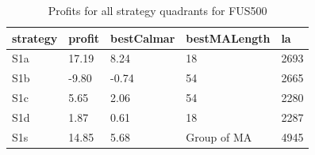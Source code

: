 \documentclass{tewiart}
\begin{document}
\newpage
\begin{table}[!t]
\caption{Profits for all strategy quadrants for FUS500}
 \begin{center}
 \begin{tabular}{|l|l|l|l|l|}
 \hline \textbf{strategy} & \textbf{profit} & \textbf{bestCalmar} & \textbf{bestMALength} & \textbf{la} \\ \hline
S1a & 17.19 & 8.24 & 18 & 2693\\ \hline
S1b & -9.80 & -0.74 & 54 & 2665\\ \hline
S1c & 5.65 & 2.06 & 54 & 2280\\ \hline
S1d & 1.87 & 0.61 & 18 & 2287\\ \hline
S1s & 14.85 & 5.68 & Group of MA & 4945\\
\hline \end{tabular}
 \end{center}
 \end{table}
\FloatBarrier
\end{document}
